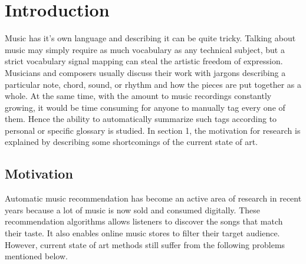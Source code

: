 
\chapter{Introduction} %

\label{Chapter1} %


\newcommand{\keyword}[1]{\textbf{#1}}
\newcommand{\tabhead}[1]{\textbf{#1}}
\newcommand{\code}[1]{\texttt{#1}}
\newcommand{\file}[1]{\texttt{\bfseries#1}}
\newcommand{\option}[1]{\texttt{\itshape#1}}


Music has it’s own language and describing it can be quite tricky. Talking about music may simply require as much vocabulary as any technical subject, but a strict vocabulary signal mapping can steal the artistic freedom of expression. Musicians and composers usually discuss their work with jargons describing a particular note, chord, sound, or rhythm and how the pieces are put together as a whole. At the same time, with the amount to music recordings constantly growing, it would be time consuming for anyone to manually tag every one of them. Hence the ability to automatically summarize such tags according to personal or specific glossary is studied.  In section 1, the motivation for research is explained by describing some shortcomings of the current state of art.  




\section{Motivation}
Automatic music recommendation has become an active area of research in recent years because a lot of music is now sold and consumed digitally. These recommendation algorithms allows listeners to discover the songs that match their taste.  It also enables online music stores to filter their target audience. However, current state of art methods still suffer from the following problems mentioned below.


